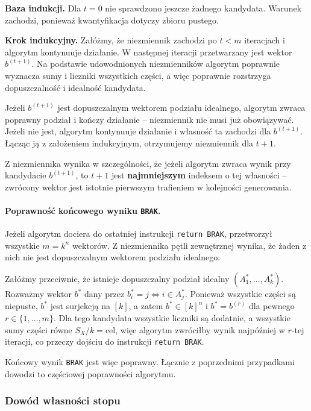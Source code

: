 \documentclass[11pt]{article}
\begin{document}
\noindent \textbf{Baza indukcji.} Dla \(t=0\) nie sprawdzono jeszcze żadnego kandydata. Warunek zachodzi, ponieważ kwantyfikacja dotyczy zbioru pustego.

\noindent \textbf{Krok indukcyjny.} Załóżmy, że niezmiennik zachodzi po \(t<m\) iteracjach i algorytm kontynuuje działanie. W następnej iteracji przetwarzany jest wektor \(b^{(t+1)}\). Na podstawie udowodnionych niezmienników algorytm poprawnie wyznacza sumy i liczniki wszystkich części, a więc poprawnie rozstrzyga dopuszczalność i idealność kandydata.

Jeżeli \(b^{(t+1)}\) jest dopuszczalnym wektorem podziału idealnego, algorytm zwraca poprawny podział i kończy działanie -- niezmiennik nie musi już obowiązywać. Jeżeli nie jest, algorytm kontynuuje działanie i własność ta zachodzi dla \(b^{(t+1)}\). Łącząc ją z założeniem indukcyjnym, otrzymujemy niezmiennik dla \(t+1\).

Z niezmiennika wynika w szczególności, że jeżeli algorytm zwraca wynik przy kandydacie \(b^{(t+1)}\), to \(t+1\) jest \textbf{najmniejszym} indeksem o tej własności -- zwrócony wektor jest istotnie pierwszym trafieniem w kolejności generowania.

\paragraph{Poprawność końcowego wyniku \texttt{BRAK}.}

Jeżeli algorytm dociera do ostatniej instrukcji \texttt{return BRAK}, przetworzył wszystkie \(m=k^n\) wektorów. Z niezmiennika pętli zewnętrznej wynika, że żaden z nich nie jest dopuszczalnym wektorem podziału idealnego.

Załóżmy przeciwnie, że istnieje dopuszczalny podział idealny \((A_1^{*},\ldots,A_k^{*})\). Rozważmy wektor \(b^{*}\) dany przez \(b^{*}_i=j\iff i\in A_j^{*}\). Ponieważ wszystkie części są niepuste, \(b^{*}\) jest surjekcją na \([k]\), a zatem \(b^{*}\in[k]^n\) i \(b^{*}=b^{(r)}\) dla pewnego \(r\in\{1,\ldots,m\}\). Dla tego kandydata wszystkie liczniki są dodatnie, a wszystkie sumy części równe \(S_X/k=\mathrm{cel}\), więc algorytm zwróciłby wynik najpóźniej w \(r\)-tej iteracji, co przeczy dojściu do instrukcji \texttt{return BRAK}.

Końcowy wynik \texttt{BRAK} jest więc poprawny. Łącznie z poprzednimi przypadkami dowodzi to częściowej poprawności algorytmu.

\subsubsection{Dowód własności stopu}
\end{document}
